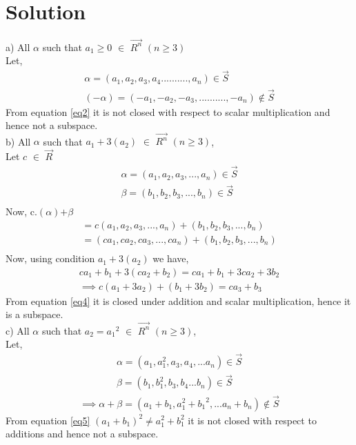 \documentclass[journal,12pt,twocolumn]{IEEEtran}
\begin{document}
\section{Solution}
a)
All $\alpha$ such that $a_1\geq0$ $\in$ $\vec{R^n}$ $(n\geq3)$\\
Let,
\begin{align}\label{eq2}
\alpha=(a_1,a_2,a_3,a_4..........,a_n) \in \vec{S}\nonumber\\
(-\alpha)=(-a_1,-a_2,-a_3,..........,-a_n) {\not\in} \vec{S}
\end{align}
From equation \eqref{eq2} it is not closed with respect to scalar multiplication and hence not a subspace.\\
b)
All $\alpha$ such that $a_1+3(a_2)$ $\in$ $\vec{R^n}$ $(n\geq3)$,\\
Let $c$ $\in$ $\vec{R}$
\begin{align}\label{eq3}
\alpha=(a_1,a_2,a_3,...,a_n) \in \vec{S} \nonumber\\
\beta=(b_1,b_2,b_3,...,b_n) \in \vec{S}\nonumber\\
\end{align}
Now,
c.$(\alpha)$$+$$\beta$
\begin{align}
=c(a_1,a_2,a_3,...,a_n)+(b_1,b_2,b_3,...,b_n)\nonumber\\
=(ca_1,ca_2,ca_3,...,ca_n)+(b_1,b_2,b_3,...,b_n)\nonumber\\
\end{align}
Now, using condition $a_1+3(a_2)$ we have,
\begin{align}\label{eq4}
ca_1+b_1+3(ca_2+b_2)=ca_1+b_1+3ca_2+3b_2\nonumber\\
\implies c(a_1+3a_2)+(b_1+3b_2)=ca_3+b_3
\end{align}
From equation \eqref{eq4} it is closed under addition and scalar multiplication, hence it is a subspace. \\
c)
All $\alpha$ such that $a_2=a_1{^2}$ $\in$ $\vec{R^n}$ $(n\geq3)$,\\
Let,
\begin{align}\label{eq5}
 \alpha=(a_1,a_1^{2},a_3,a_4,...a_n) \in \vec{S}\nonumber\\
 \beta=(b_1,b_1^{2},b_3,b_4...b_n)\in \vec{S}\nonumber
\end{align}
\begin{align}
 \implies \alpha+\beta= (a_1+b_1,a_1^{2}+{b_1}^2,...a_n+b_n) {\not\in} \vec{S}
\end{align}
 From equation \eqref{eq5} $(a_1+b_1)^{2}\neq a_1^2+b_1^2$
 it is not closed with respect to additions and hence not a subspace.\\
\end{document}
